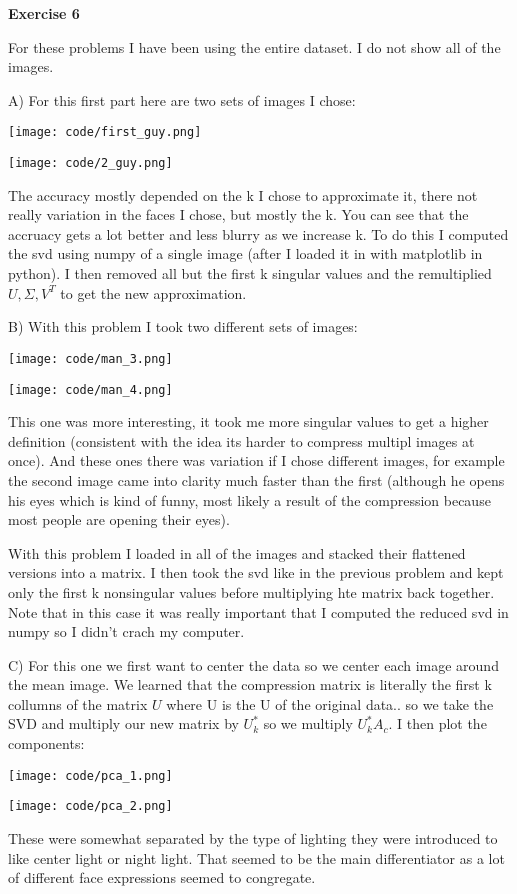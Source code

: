 \documentclass[12pt]{article}
\newenvironment{exercise}[1]{\vspace{.1in}\noindent\textbf{Exercise #1 \hspace{.05em}}}{}
\theoremstyle{definition}
\theoremstyle{remark}
\begin{document}
\begin{exercise}{6}

	For these problems I have been using the entire dataset. I do not show all of the images.

	A) For this first part here are two sets of images I chose:

	\texttt{[image: code/first\_guy.png]}

	\texttt{[image: code/2\_guy.png]}

	The accuracy mostly depended on the k I chose to approximate it, there not really variation in the faces I chose, but mostly the k. You can see that the accruacy gets a lot better and less blurry as we increase k. To do this I computed the svd using numpy of a single image (after I loaded it in with matplotlib in python). I then removed all but the first k singular values and the remultiplied $U,\Sigma,V^T$ to get the new approximation.

	B) With this problem I took two different sets of images:


	\texttt{[image: code/man\_3.png]}

	\texttt{[image: code/man\_4.png]}

	This one was more interesting, it took me more singular values to get a higher definition (consistent with the idea its harder to compress multipl images at once). And these ones there was variation if I chose different images, for example the second image came into clarity much faster than the first (although he opens his eyes which is kind of funny, most likely a result of the compression because most people are opening their eyes).

	With this problem I loaded in all of the images and stacked their flattened versions into a matrix. I then took the svd like in the previous problem and kept only the first k nonsingular values before multiplying hte matrix back together. Note that in this case it was really important that I computed the reduced svd in numpy so I didn't crach my computer.


	C) For this one we first want to center the data so we center each image around the mean image. We learned that the compression matrix is literally the first k collumns of the matrix $U$ where U is the U of the original data.. so we take the SVD and multiply our new matrix by $U_k^*$ so we multiply $U_k^*A_c$. I then plot the components:

	\texttt{[image: code/pca\_1.png]}

	\texttt{[image: code/pca\_2.png]}

	These were somewhat separated by the type of lighting they were introduced to like center light or night light. That seemed to be the main differentiator as a lot of different face expressions seemed to congregate.

\end{exercise}
\end{document}
